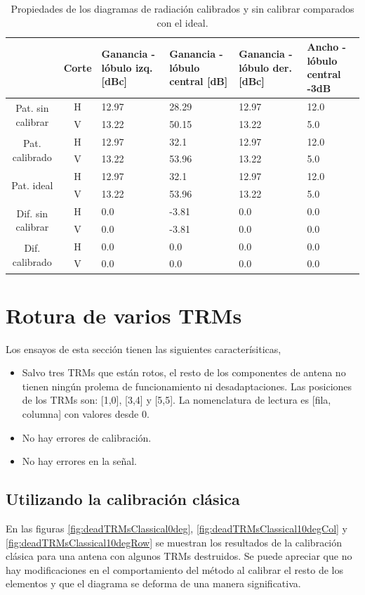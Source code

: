 \begin{table}[H]
  \footnotesize
  \centering
  \begin{tabular}{|c|c|p{2cm}|p{2.5cm}|p{2.5cm}|p{2.5cm}|}
    \cline{2-6}
    \multicolumn{1}{c|}{} & Corte & Ganancia - lóbulo izq. [dBc] & Ganancia - lóbulo central [dB] &
    Ganancia - lóbulo der. [dBc] & Ancho - lóbulo central -3dB \tabularnewline\hline
    \multirow{2}{2cm}{Pat. sin calibrar} & H & 12.97 & 28.29 & 12.97 & 12.0 \tabularnewline\cline{2-6}
     & V & 13.22 & 50.15 & 13.22 & 5.0 \tabularnewline\hline
    \multirow{2}{2cm}{Pat. calibrado} & H & 12.97 & 32.1 & 12.97 & 12.0 \tabularnewline\cline{2-6}
     & V & 13.22 & 53.96 & 13.22 & 5.0 \tabularnewline\hline
    \multirow{2}{2cm}{Pat. ideal} & H & 12.97 & 32.1 & 12.97 & 12.0 \tabularnewline\cline{2-6}
     & V & 13.22 & 53.96 & 13.22 & 5.0 \tabularnewline\hline
    \multirow{2}{2cm}{Dif. sin calibrar} & H & 0.0 & -3.81 & 0.0 & 0.0\tabularnewline\cline{2-6}
     & V & 0.0 & -3.81 & 0.0 & 0.0 \tabularnewline\hline
    \multirow{2}{2cm}{Dif. calibrado} & H & 0.0 & 0.0 & 0.0 & 0.0 \tabularnewline\cline{2-6}
     & V & 0.0 & 0.0 & 0.0 & 0.0 \tabularnewline\hline
  \end{tabular}
  \caption{Propiedades de los diagramas de radiación calibrados y sin calibrar comparados con el ideal.}
  \label{tab:nonErrMutual10degRow}
\end{table}


\section{Rotura de varios TRMs}
Los ensayos de esta sección tienen las siguientes caracterísiticas,
\begin{itemize}
	\item Salvo tres TRMs que están rotos, el resto de los componentes de antena no tienen ningún prolema de funcionamiento ni 
		desadaptaciones. Las posiciones de los TRMs son: [1,0], [3,4] y [5,5]. La nomenclatura de lectura es [fila, columna] con 
		valores desde 0.
	\item No hay errores de calibración.
	\item No hay errores en la señal.
\end{itemize}

\subsection{Utilizando la calibración clásica}
En las figuras \ref{fig:deadTRMsClassical0deg}, \ref{fig:deadTRMsClassical10degCol} y \ref{fig:deadTRMsClassical10degRow} se 
muestran los resultados de la calibración clásica para una antena con algunos TRMs destruidos. Se puede apreciar que no hay 
modificaciones en el comportamiento del método al calibrar el resto de los elementos y que el diagrama se deforma de una manera 
significativa.

